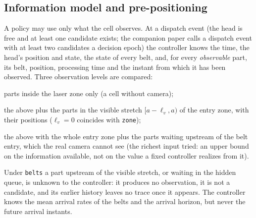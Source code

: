 \documentclass[11pt,a4paper]{article}
\newcommand{\lv}{\ell_{v}}
\begin{document}
\subsection{Information model and pre-positioning}
A policy may use only what the cell observes. At a dispatch event (the head is free and at
least one candidate exists; the companion paper calls a dispatch event with at least two
candidates a decision epoch) the controller knows the time, the head's position and state,
the state of every belt, and, for every \emph{observable} part, its belt, position,
processing time and the instant from which it has been observed. Three observation levels
are compared:
\begin{description}[nosep]
\item[\texttt{zone}] parts inside the laser zone only (a cell without camera);
\item[\texttt{belts}] the above plus the parts in the visible stretch $[a-\lv,a)$ of the
  entry zone, with their positions ($\lv=0$ coincides with \texttt{zone});
\item[\texttt{full}] the above with the whole entry zone plus the parts waiting upstream
  of the belt entry, which the real camera cannot see (the richest input tried: an upper
  bound on the information available, not on the value a fixed controller realizes from it).
\end{description}
Under \texttt{belts} a part upstream of the visible stretch, or waiting in the hidden
queue, is unknown to the controller: it produces no observation, it is not a candidate, and
its earlier history leaves no trace once it appears. The controller knows the mean arrival
rates of the belts and the arrival horizon, but never the future arrival instants.
\end{document}
